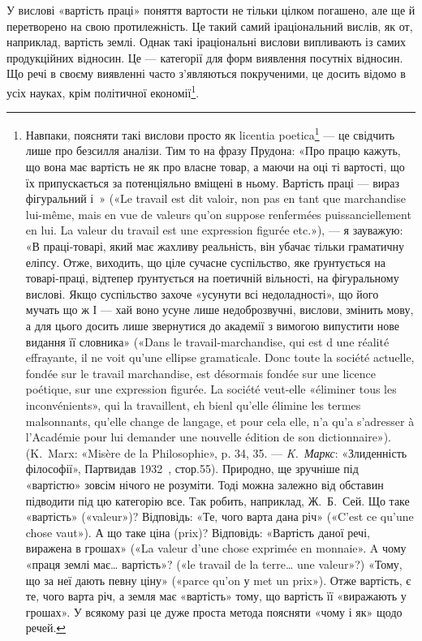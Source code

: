 У вислові «вартість праці» поняття вартости не тільки цілком
погашено, але ще й перетворено на свою протилежність. Це такий
самий іраціональний вислів, як от, наприклад, вартість землі.
Однак такі іраціональні вислови випливають із самих продукційних
відносин. Це — категорії для форм виявлення посутніх
відносин. Що речі в своєму виявленні часто з’являються
покрученими, це досить відомо в усіх науках, крім політичної
економії\footnote{
Навпаки, поясняти такі вислови просто як licentia poetica\footnote*{
поетичні вільності. \emph{Ред.}
} — це свідчить лише про безсилля аналізи. Тим то на фразу Прудона: «Про
працю кажуть, що вона має вартість не як про власне товар, а маючи
на оці ті вартості, що їх припускається за потенціяльно вміщені в ньому.
Вартість праці — вираз фігуральний і~» («Le travail est dit valoir,
non pas en tant que marchandise lui-même, mais en vue de valeurs qu’on
suppose renfermées puissanciellement en lui. La valeur du travail est une
expression figurée etc.»), — я зауважую: «В праці-товарі, який має
жахливу реальність, він убачає тільки граматичну еліпсу. Отже,
виходить, що ціле сучасне суспільство, яке ґрунтується на товарі-праці,
відтепер ґрунтується на поетичній вільності, на фігуральному вислові.
Якщо суспільство захоче «усунути всі недоладності», що його мучать
що ж І — хай воно усуне лише недоброзвучні, вислови, змінить мову, а для
цього досить лише звернутися до академії з вимогою випустити нове
видання її словника» («Dans le travail-marchandise, qui est d une réalité
effrayante, il ne voit qu’une ellipse gramaticale. Donc toute la société actuelle,
fondée sur le travail marchandise, est désormais fondée sur une licence
poétique, sur une expression figurée. La société veut-elle «éliminer tous
les inconvénients», qui la travaillent, eh bienl qu’elle élimine les termes
malsonnants, qu’elle change de langage, et pour cela elle, n’a qu’a s’adresser
à l’Académie pour lui demander une nouvelle édition de son dictionnaire»).
(K.~Marx: «Misère de la Philosophie», p. 34, 35. — \emph{K.~Маркс}: «Злиденність
філософії», Партвидав 1932~, стор.55). Природно, ще зручніше під «вартістю»
зовсім нічого не розуміти. Тоді можна залежно від обставин підводити
під цю категорію все. Так робить, наприклад, Ж.~Б.~Сей. Що
таке «вартість» («valeur»)? Відповідь: «Те, чого варта дана річ» («C’est
ce qu’une chose vaut»). А що таке ціна (prix)? Відповідь: «Вартість даної
речі, виражена в грошах» («La valeur d’une chose exprimée en monnaie».
A чому «праця землі має\dots{} вартість»? («le travail de la terre\dots{} une
valeur»?) «Тому, що за неї дають певну ціну» («parce qu’on у met un
prix»). Отже вартість, є те, чого варта річ, а земля має «вартість» тому,
що вартість її «виражають у грошах». У всякому разі це дуже проста
метода поясняти «чому і як» щодо речей.
}.

